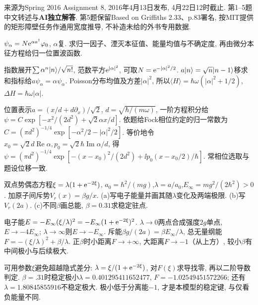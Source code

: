 来源为Spring 2016 Assignment 8, 2016年4月13日发布, 4月22日12时截止. 第1--5题中文转述与\textbf{AI独立解答}. 第5题保留Based on Griffiths 2.33、p.83署名, 按MIT提供的矩形障壁任务作通用宽度推导, 不补造未给的外书专用数据.
\begin{exercise}
$\psi_\alpha=N\mathrm e^{\alpha a^\dagger}\varphi_0$, $\alpha$复. 求归一因子、湮灭本征值、能量均值与不确定度, 再由微分本征方程给归一位置波函数.
\end{exercise}
\begin{solution}
指数展开$\sum\alpha^n\lvert n\rangle/\sqrt{n!}$, 范数平方$\mathrm e^{|\alpha|^2}$, 可取$N=\mathrm e^{-|\alpha|^2/2}$. $a\lvert n\rangle=\sqrt n\lvert n-1\rangle$移求和指标给$a\psi_\alpha=\alpha\psi_\alpha$. Poisson分布均值及方差$|\alpha|^2$, 所以$\langle H\rangle=\hbar\omega(|\alpha|^2+1/2)$,$\Delta H=\hbar\omega|\alpha|$.

位置表示$a=(x/d+d\partial_x)/\sqrt2$, $d=\sqrt{\hbar/(m\omega)}$, 一阶方程积分给$\psi=C\exp[-x^2/(2d^2)+\sqrt2\alpha x/d]$. 依题给Fock相位约定的归一常数为$C=(\pi d^2)^{-1/4}\exp[-\alpha^2/2-|\alpha|^2/2]$. 等价地令$x_0=\sqrt2d\operatorname{Re}\alpha,p_0=\sqrt2\hbar\operatorname{Im}\alpha/d$, 得$\psi=(\pi d^2)^{-1/4}\exp[-(x-x_0)^2/(2d^2)+\ii p_0(x-x_0/2)/\hbar]$. 常相位选取与题设位移一致.
\end{solution}
\begin{exercise}
双点势偶态方程$\xi=\lambda(1+\mathrm e^{-2\xi})$, $a_0=\hbar^2/(mg)$,$\lambda=a/a_0$,$E_\infty=mg^2/(2\hbar^2)>0$. 加原子间斥势$V_r(x)=\beta g/x$. (a)写电子能量并画其随$\lambda$变化及两端极限. (b)写$V_r(2a)$. (c)不同$\beta$画总能, $\beta=0.31$求稳定驻点.
\end{exercise}
\begin{solution}
电子能$E=-E_\infty(\xi/\lambda)^2=-E_\infty(1+\mathrm e^{-2\xi})^2$. $\lambda\to0$两点合成强度$2g$单点,$E\to-4E_\infty$; $\lambda\to\infty$则$E\to-E_\infty$. 斥能$\beta g/(2a)=\beta E_\infty/\lambda$, 总无量纲能$F=-(\xi/\lambda)^2+\beta/\lambda$. 正$\beta$时小距离$F\to+\infty$, 大距离$F\to-1$（从上方）, 较小$\beta$有中间极小与后续极大.

可用参数$\xi$避免超越隐式差分: $\lambda=\xi/(1+\mathrm e^{-2\xi})$, 对$F(\xi)$求导找零, 再以二阶导数判定. $\beta=.31$时稳定极小$\lambda=0.401295411652477$, $F=-1.02549451572266$; 还有$\lambda=1.80845855916$不稳定极大. 极小低于分离能$-1$, 才是本模型的稳定键, 与仅看负能量不同.

\end{solution}
